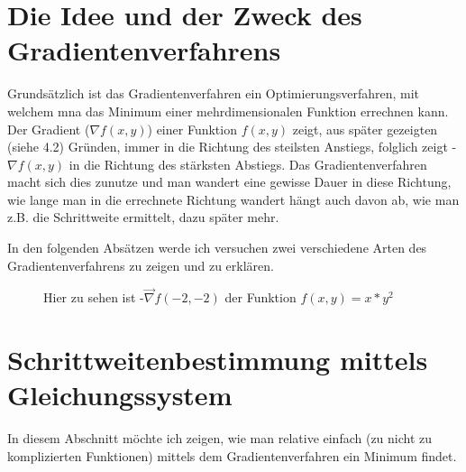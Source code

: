 \documentclass[a4paper, 11pt]{article}
\begin{document}



\tableofcontents

\newpage
\section{Die Idee und der Zweck des Gradientenverfahrens}

Grundsätzlich ist das Gradientenverfahren ein Optimierungsverfahren, mit welchem mna das Minimum einer mehrdimensionalen Funktion errechnen kann. Der Gradient (${\nabla}f(x,y)$) einer Funktion \(f(x,y)\) zeigt, aus später gezeigten (siehe 4.2) Gründen, immer in die Richtung des steilsten Anstiegs, folglich zeigt -${\nabla}f(x,y)$ in die Richtung des stärksten Abstiegs. Das Gradientenverfahren macht sich dies zunutze und man wandert eine gewisse Dauer in diese Richtung, wie lange man in die errechnete Richtung wandert hängt auch davon ab, wie man z.B. die Schrittweite ermittelt, dazu später mehr.

In den folgenden Absätzen werde ich versuchen zwei verschiedene Arten des Gradientenverfahrens zu zeigen und zu erklären.

\begin{figure}
\centering
{}
\caption[Gradientenvektor Beispiel]
{Hier zu sehen ist -$\vec{\nabla}f(-2,-2)$ der Funktion $f(x,y)=x*y^2$}
\end{figure}

\section{Schrittweitenbestimmung mittels Gleichungssystem}
In diesem Abschnitt möchte ich zeigen, wie man relative einfach (zu nicht zu komplizierten Funktionen) mittels dem Gradientenverfahren ein Minimum findet.
\end{document}
